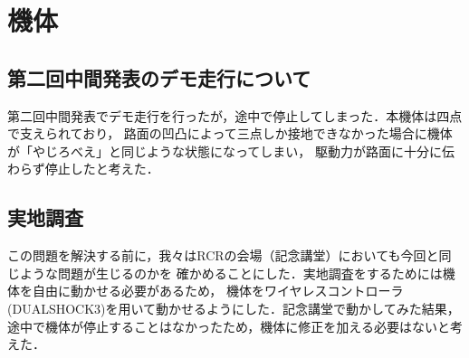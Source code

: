 \section{機体}
\subsection{第二回中間発表のデモ走行について}
第二回中間発表でデモ走行を行ったが，途中で停止してしまった．本機体は四点で支えられており，
路面の凹凸によって三点しか接地できなかった場合に機体が「やじろべえ」と同じような状態になってしまい，
駆動力が路面に十分に伝わらず停止したと考えた．

\subsection{実地調査}
この問題を解決する前に，我々はRCRの会場（記念講堂）においても今回と同じような問題が生じるのかを
確かめることにした．実地調査をするためには機体を自由に動かせる必要があるため，
機体をワイヤレスコントローラ (DUALSHOCK3)を用いて動かせるようにした．記念講堂で動かしてみた結果，
途中で機体が停止することはなかったため，機体に修正を加える必要はないと考えた．
